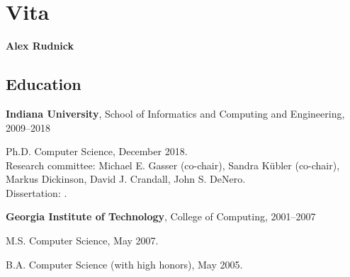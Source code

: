 \chapter*{Vita}


\def\name{Alex Rudnick}

\setlength\parindent{0em}

\pagestyle{empty}

\newcommand{\localtextbulletone}{\textcolor{gray}{\raisebox{.45ex}{\rule{.6ex}{.6ex}}}}
\renewcommand{\labelitemii}{\localtextbulletone}
\renewcommand{\labelitemi}{\localtextbulletone}

\newenvironment{itemize*}
  {\begin{itemize}
      \setlength{\itemsep}{1pt}
      \setlength{\parskip}{3pt}
  }
  {\end{itemize}}

\centerline{\Huge \textbf{\name}}

\bigskip
\bigskip

\section*{Education}
\begin{itemize*}
\item
\textbf{Indiana University}, School of Informatics and Computing and
Engineering, 2009--2018
\begin{itemize*}
\item Ph.D. Computer Science, December 2018. \\
      Research committee: Michael E. Gasser (co-chair), Sandra K\"{u}bler
      (co-chair), Markus Dickinson, David J. Crandall, John S. DeNero. \\
      Dissertation: \emph{\thesisTitle}.
\end{itemize*}

\item
\textbf{Georgia Institute of Technology}, College of Computing, 2001--2007
\begin{itemize*}
\item M.S. Computer Science, May 2007.
\item B.A. Computer Science (with high honors), May 2005.
\end{itemize*}
\end{itemize*}


